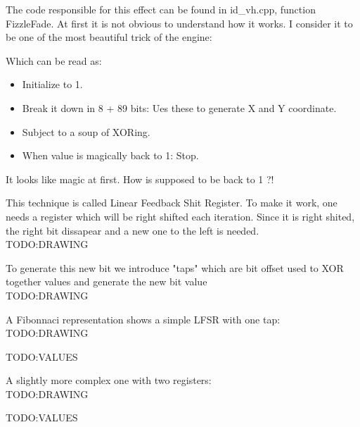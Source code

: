 The code responsible for this effect can be found in id\_vh.cpp, function FizzleFade. At first it is not obvious to understand how it works. I consider it to be one of the most beautiful trick of the engine:\\
\par
\begin{minipage}{\textwidth}

\end{minipage}
\par
Which can be read as:\\
\begin{itemize}
\item Initialize  to 1.
\item Break it down in 8 + 89 bits: Ues these to generate X and Y coordinate.
\item Subject  to a soup of XORing.
\item When  value is magically back to 1: Stop.
\end{itemize}        
It looks like magic at first. How is  supposed to be back to 1 ?!\\
\par
This technique is called Linear Feedback Shit Register. To make it work, one needs a register which will be right shifted each iteration. Since it is right shited, the right bit dissapear and a new one to the left is needed.\\
TODO:DRAWING\\
\par
To generate this new bit we introduce "taps" which are bit offset used to XOR together values and generate the new bit value\\
TODO:DRAWING\\
\par
A Fibonnaci representation shows a simple LFSR with one tap:\\
TODO:DRAWING\\
\par
TODO:VALUES\\
\par
A slightly more complex one with two registers:\\
TODO:DRAWING\\
\par
TODO:VALUES\\
\par

\par
\begin{minipage}{\textwidth}

\end{minipage}
\par

